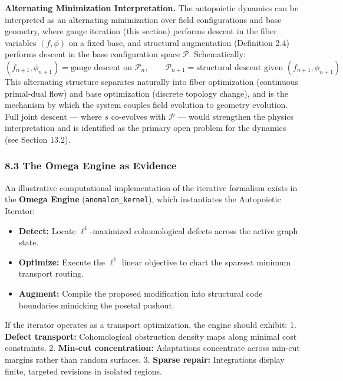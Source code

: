 \documentclass[
]{article}
\providecommand{\tightlist}{%
  \setlength{\itemsep}{0pt}\setlength{\parskip}{0pt}}
\begin{document}
\textbf{Alternating Minimization Interpretation.} The autopoietic
dynamics can be interpreted as an alternating minimization over field
configurations and base geometry, where gauge iteration (this section)
performs descent in the fiber variables \((f, \phi)\) on a fixed base,
and structural augmentation (Definition 2.4) performs descent in the
base configuration space \(\mathcal{P}\). Schematically:
\[(f_{n+1}, \phi_{n+1}) = \text{gauge descent on } \mathcal{P}_n, \qquad \mathcal{P}_{n+1} = \text{structural descent given } (f_{n+1}, \phi_{n+1})\]
This alternating structure separates naturally into fiber optimization
(continuous primal-dual flow) and base optimization (discrete topology
change), and is the mechanism by which the system couples field
evolution to geometry evolution. Full joint descent --- where \(s\)
co-evolves with \(\mathcal{P}\) --- would strengthen the physics
interpretation and is identified as the primary open problem for the
dynamics (see Section 13.2).

\subsubsection{8.3 The Omega Engine as
Evidence}\label{the-omega-engine-as-evidence}

An illustrative computational implementation of the iterative formalism
exists in the \textbf{Omega Engine} (\texttt{anomalon\_kernel}), which
instantiates the Autopoietic Iterator:

\begin{itemize}
\tightlist
\item
  \textbf{Detect:} Locate \(\ell^1\)-maximized cohomological defects
  across the active graph state.
\item
  \textbf{Optimize:} Execute the \(\ell^1\) linear objective to chart
  the sparsest minimum transport routing.
\item
  \textbf{Augment:} Compile the proposed modification into structural
  code boundaries mimicking the posetal pushout.
\end{itemize}

If the iterator operates as a transport optimization, the engine should
exhibit: 1. \textbf{Defect transport:} Cohomological obstruction density
maps along minimal cost constraints. 2. \textbf{Min-cut concentration:}
Adaptations concentrate across min-cut margins rather than random
surfaces. 3. \textbf{Sparse repair:} Integrations display finite,
targeted revisions in isolated regions.
\end{document}
